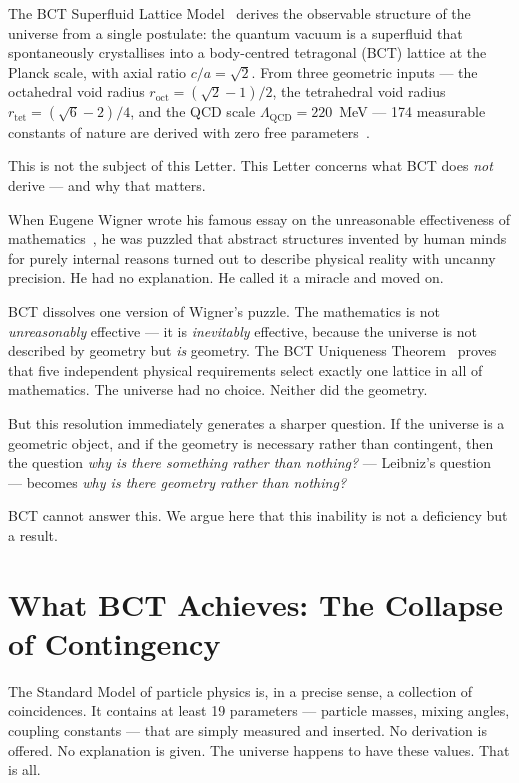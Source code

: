 \documentclass[aps,prl,twocolumn,superscriptaddress,floatfix]{revtex4-2}
\newcommand{\roct}{r_{\mathrm{oct}}}
\newcommand{\rtet}{r_{\mathrm{tet}}}
\begin{document}
The BCT Superfluid Lattice Model~\cite{BCT_Monograph} derives the 
observable structure of the universe from a single postulate: the 
quantum vacuum is a superfluid that spontaneously crystallises into 
a body-centred tetragonal (BCT) lattice at the Planck scale, with 
axial ratio $c/a = \sqrt{2}$. From three geometric inputs --- the 
octahedral void radius $\roct = (\sqrt{2}-1)/2$, the tetrahedral 
void radius $\rtet = (\sqrt{6}-2)/4$, and the QCD scale 
$\Lambda_\mathrm{QCD} = 220$~MeV --- 174 measurable constants of 
nature are derived with zero free parameters~\cite{BCT_L1,BCT_Registry}.

This is not the subject of this Letter. This Letter concerns what BCT 
does \emph{not} derive --- and why that matters.

When Eugene Wigner wrote his famous essay on the unreasonable 
effectiveness of mathematics~\cite{Wigner1960}, he was puzzled that 
abstract structures invented by human minds for purely internal 
reasons turned out to describe physical reality with uncanny precision. 
He had no explanation. He called it a miracle and moved on.

BCT dissolves one version of Wigner's puzzle. The mathematics is not 
\emph{unreasonably} effective --- it is \emph{inevitably} effective, 
because the universe is not described by geometry but \emph{is} 
geometry. The BCT Uniqueness Theorem~\cite{BCT_L18} proves that five 
independent physical requirements select exactly one lattice in all 
of mathematics. The universe had no choice. Neither did the geometry.

But this resolution immediately generates a sharper question. If the 
universe is a geometric object, and if the geometry is necessary rather 
than contingent, then the question \emph{why is there something rather 
than nothing?} --- Leibniz's question~\cite{Leibniz1714} --- becomes 
\emph{why is there geometry rather than nothing?}

BCT cannot answer this. We argue here that this inability is not a 
deficiency but a result.

\section{What BCT Achieves: The Collapse of Contingency}

The Standard Model of particle physics is, in a precise sense, a 
collection of coincidences. It contains at least 19 parameters --- 
particle masses, mixing angles, coupling constants --- that are simply 
measured and inserted. No derivation is offered. No explanation is 
given. The universe happens to have these values. That is all.
\end{document}
